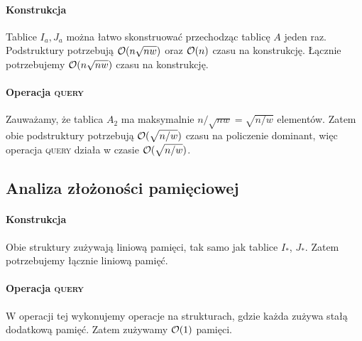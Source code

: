 \paragraph{Konstrukcja} Tablice $I_a, J_a$ można łatwo skonstruować przechodząc tablicę $A$ jeden raz. Podstruktury potrzebują $\mathcal{O}(n\sqrt{nw})$ oraz $\mathcal{O}(n)$ czasu na konstrukcję. Łącznie potrzebujemy $\mathcal{O}(n\sqrt{nw})$ czasu na konstrukcję.

\paragraph{Operacja \textsc{query}} Zauważamy, że tablica $A_2$ ma maksymalnie $n / \sqrt{nw} = \sqrt{n/w}$ elementów. Zatem obie podstruktury potrzebują $\mathcal{O}(\sqrt{n/w})$ czasu na policzenie dominant, więc operacja \textsc{query} działa w czasie $\mathcal{O}(\sqrt{n/w})$.

\subsection{Analiza złożoności pamięciowej}
\paragraph{Konstrukcja} Obie struktury zużywają liniową pamięci, tak samo jak tablice $I_*$, $J_*$. Zatem potrzebujemy łącznie liniową pamięć.

\paragraph{Operacja \textsc{query}} W operacji tej wykonujemy operacje na strukturach, gdzie każda zużywa stałą dodatkową pamięć. Zatem zużywamy $\mathcal{O}(1)$ pamięci.
\newpage